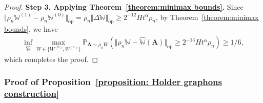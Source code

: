 \documentclass[11pt]{article}
\newcommand{\op}{\mathrm{op}}
\newcommand{\bA}{\bm{A}}
\newcommand{\bbW}{\mathbb{W}}
\newcommand{\bbP}{\mathbb{P}}
\newcommand{\<}{\langle}
\renewcommand{\>}{\rangle}
\theoremstyle{plain}
\theoremstyle{definition}
\theoremstyle{remark}
\begin{document}
{\begin{proof}
	
	\medskip
	\noindent \textbf{Step 3. Applying Theorem~\ref{theorem:minimax bounds}.} Since $\Vert \rho_n \bbW^{(1)} - \rho_n \bbW^{(0)} \Vert_{\op} = \rho_n \Vert \Delta \bbW \Vert_{\op} \ge 2^{-12} H t^{\alpha} \rho_n$, by Theorem~\ref{theorem:minimax bounds}, we have
    \begin{align*}
        \inf_{\widehat{\bbW}} \max_{W \in \{W^{(0)}, W^{(1)}\}} \bbP_{\bA \sim \rho_n W} \left (   \Vert \rho_n \bbW -  \widehat{\bbW}(\bA) \Vert_{\op} \ge 2^{-13} H t^{\alpha} \rho_n \right ) \ge 1/6,
    \end{align*}
    which completes the proof.
\end{proof}


\subsubsection{Proof of Proposition~\ref{proposition: Holder graphons construction}}
\label{section: proof of holder graphon construction}

}
\end{document}
